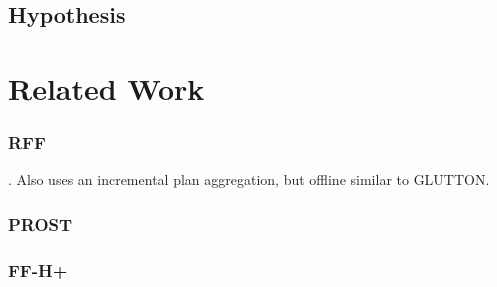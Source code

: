 \documentclass[runningheads,a4paper]{llncs}
\begin{document}
\subsection{Hypothesis}


\section{Related Work}

\subsubsection{RFF}. Also uses an incremental plan aggregation, but offline similar to GLUTTON.

\subsubsection{PROST}

\subsubsection{FF-H+}

%

\end{document}
